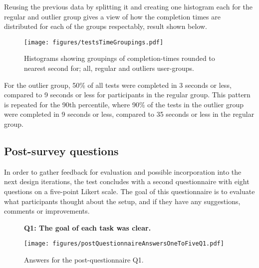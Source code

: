     Reusing the previous data by splitting it and creating one histogram
    each for the regular and outlier group gives a view of how the completion
    times are distributed for each of the groups respectably, result shown
    below.

    \begin{figure}[h!]
      \centering
      \texttt{[image: figures/testsTimeGroupings.pdf]}
      \caption{
        Histograms showing groupings of completion-times rounded to nearest
        second for; all, regular and outliers user-groups.
      }
    \end{figure}

    For the outlier group, 50\% of all tests were completed in 3 seconds or
    less, compared to 9 seconds or less for participants in the regular
    group. This pattern is repeated for the 90th percentile, where 90\% of
    the tests in the outlier group were completed in 9 seconds or less,
    compared to 35 seconds or less in the regular group.

%
%
%

  \subsection{Post-survey questions}

    In order to gather feedback for evaluation and possible incorporation
    into the next design iterations, the test concludes with a second
    questionnaire with eight questions on a five-point Likert scale. The goal
    of this questionnaire is to evaluate what participants thought about the setup,
    and if they have any suggestions, comments or improvements.

    \begin{figure}[h!]
      \textbf{Q1: The goal of each task was clear.}
      \begin{center}
        \texttt{[image: figures/postQuestionnaireAnswersOneToFiveQ1.pdf]}
        \vspace{-1cm}
        \caption{Answers for the post-questionnaire Q1.}
      \end{center}
    \end{figure}

